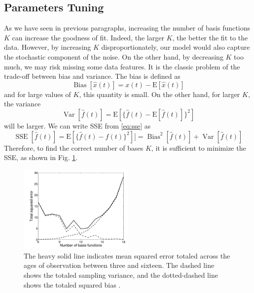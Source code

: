 \subsection{Parameters Tuning} 
As we have seen in previous paragraphs, increasing the number of basis functions $K$ can increase the goodness of fit. Indeed, the larger $K$, the better the fit to the data. However, by increasing $K$ disproportionately, our model would also capture the stochastic component of the noise. On the other hand, by decreasing $K$ too much, we may risk missing some data features. It is the classic problem of the trade-off between bias and variance. The bias is defined as
\begin{equation}
    \label{eq:bias}
    \operatorname{Bias}[\hat{x}(t)]=x(t)-\mathrm{E}[\hat{x}(t)]
\end{equation}
and for large values of $K$, this quantity is small. On the other hand, for larger $K$, the variance
\begin{equation}
    \label{eq:variance}
    \operatorname{Var}[\hat{f}(t)]=\mathrm{E}\left[\{\hat{f}(t)-\mathrm{E}[\hat{f}(t)]\}^2\right]
\end{equation}
will be larger. We can write SSE from \ref{eq:sse} as 
\begin{equation}
    \label{eq:ssebias}
    \operatorname{SSE}[\hat{f}(t)]=\mathrm{E}\left[\{\hat{f}(t)-f(t)\}^2\right]] = \operatorname{Bias}^2[\hat{f}(t)]+\operatorname{Var}[\hat{f}(t)]
\end{equation}
Therefore, to find the correct number of bases $K$, it is sufficient to minimize the SSE, as shown in Fig. \ref{fig:tradeoff}.
\begin{figure}
\centering
\includegraphics[width=0.5\textwidth]{Images/tradeoff.png}
\caption[Bias variance trade-off.]{The heavy solid line indicates mean squared error totaled across the ages of observation between three and sixteen. The dashed line shows the totaled sampling variance, and the dotted-dashed line shows the totaled squared bias \cite{ramsay_functional_2006}.}
\label{fig:tradeoff}
\end{figure}

